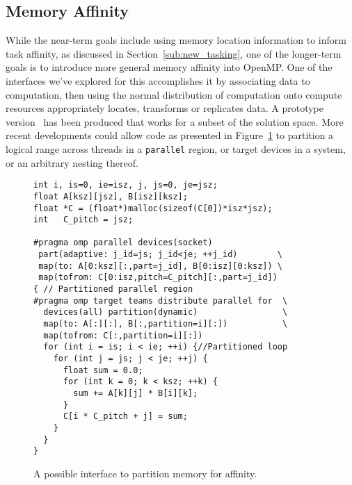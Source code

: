 \subsection{Memory Affinity}
\label{sub:memory_affinity}


While the near-term goals include using memory location information to inform
task affinity, as discussed in Section~\ref{sub:new_tasking}, one of the
longer-term goals is to introduce more general memory affinity into OpenMP.  One
of the interfaces we've explored for this accomplishes it by associating data to
computation, then using the normal distribution of computation onto compute
resources appropriately locates, transforms or replicates data.  A prototype
version~\cite{ctsar-tpds,scogland:7Hpt64iV} has been produced that works for a
subset of the solution space.  More recent developments could allow code as presented
in Figure~\ref{fig:atsar-gemm} to partition a logical range across threads in a
\texttt{parallel} region, or target devices in a system, or an arbitrary nesting
thereof.

\begin{figure}
  \begin{verbatim}
int i, is=0, ie=isz, j, js=0, je=jsz;
float A[ksz][jsz], B[isz][ksz];
float *C = (float*)malloc(sizeof(C[0])*isz*jsz);
int   C_pitch = jsz;

#pragma omp parallel devices(socket)
 part(adaptive: j_id=js; j_id<je; ++j_id)        \
 map(to: A[0:ksz][:,part=j_id], B[0:isz][0:ksz]) \
 map(tofrom: C[0:isz,pitch=C_pitch][:,part=j_id])
{ // Partitioned parallel region
#pragma omp target teams distribute parallel for  \
  devices(all) partition(dynamic)                 \
  map(to: A[:][:], B[:,partition=i][:])           \
  map(tofrom: C[:,partition=i][:])
  for (int i = is; i < ie; ++i) {//Partitioned loop
    for (int j = js; j < je; ++j) {
      float sum = 0.0;
      for (int k = 0; k < ksz; ++k) {
        sum += A[k][j] * B[i][k];
      }
      C[i * C_pitch + j] = sum;
    }
  }
}
\end{verbatim}
\caption{A possible interface to partition memory for affinity.\label{fig:atsar-gemm}}
\end{figure}

